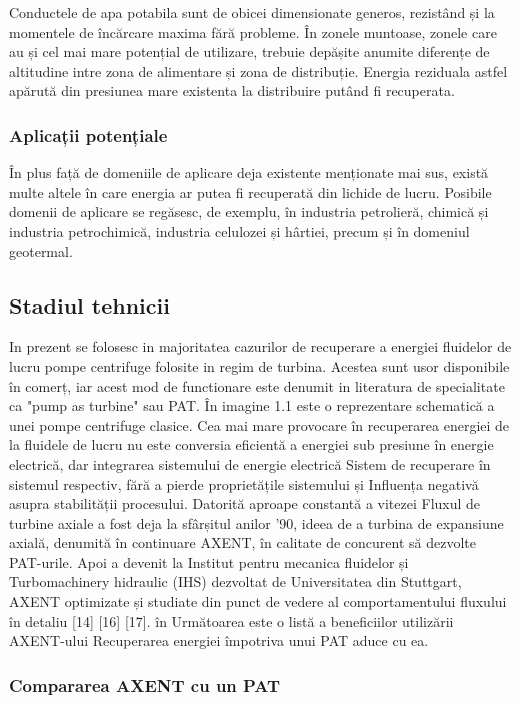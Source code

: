 Conductele de apa potabila sunt de obicei dimensionate generos, rezistând și la momentele de încărcare maxima fără probleme. În zonele muntoase, zonele care au și cel mai mare potențial de utilizare, trebuie depășite anumite diferențe de altitudine intre zona de alimentare și zona de distribuție. Energia reziduala astfel apărută din presiunea mare existenta la distribuire putând fi recuperata.


\subsubsection{Aplicații potențiale}

În plus față de domeniile de aplicare deja existente menționate mai sus, există multe altele în care energia ar putea fi recuperată din lichide de lucru. Posibile domenii de aplicare se regăsesc, de exemplu, în industria petrolieră, chimică și industria petrochimică, industria celulozei și hârtiei, precum și în domeniul geotermal.


\subsection{Stadiul tehnicii}

In prezent se folosesc in majoritatea cazurilor de recuperare a energiei fluidelor de lucru pompe centrifuge folosite in regim de turbina. Acestea sunt usor disponibile în comerț, iar acest mod de functionare este denumit in literatura de specialitate ca "pump as turbine" sau PAT. În imagine
1.1 este o reprezentare schematică a unei pompe centrifuge clasice.
Cea mai mare provocare în recuperarea energiei de la fluidele de lucru nu este
conversia eficientă a energiei sub presiune în energie electrică, dar integrarea sistemului de energie electrică
Sistem de recuperare în sistemul respectiv, fără a pierde proprietățile sistemului și
Influența negativă asupra stabilității procesului. Datorită aproape constantă a vitezei
Fluxul de turbine axiale a fost deja la sfârșitul anilor '90, ideea de a
turbina de expansiune axială, denumită în continuare AXENT, în calitate de concurent
să dezvolte PAT-urile. Apoi a devenit la Institut pentru mecanica fluidelor și
Turbomachinery hidraulic (IHS) dezvoltat de Universitatea din Stuttgart, AXENT
optimizate și studiate din punct de vedere al comportamentului fluxului în detaliu [14] [16] [17]. în
Următoarea este o listă a beneficiilor utilizării AXENT-ului
Recuperarea energiei împotriva unui PAT aduce cu ea.

\subsubsection{Compararea AXENT cu un PAT}

